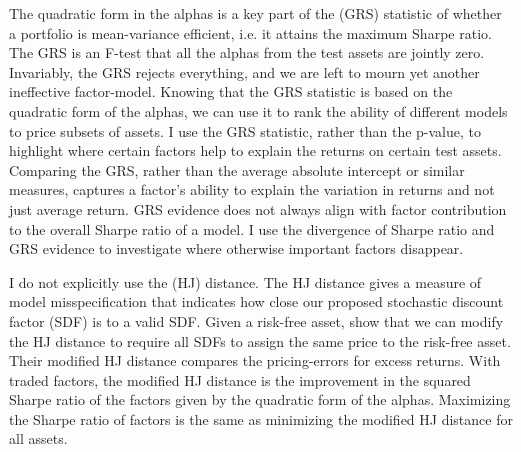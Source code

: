 The quadratic form in the alphas is a key part of the \textcite{gibbons1989test} (GRS)
statistic of whether a portfolio is mean-variance efficient, i.e. it attains the maximum
Sharpe ratio. The GRS is an F-test that all the alphas from the test assets are jointly
zero. Invariably, the GRS rejects everything, and we are left to mourn yet another
ineffective factor-model. Knowing that the GRS statistic is based on the quadratic form of
the alphas, we can use it to rank the ability of different models to price subsets of
assets. I use the GRS statistic, rather than the p-value, to highlight where certain
factors help to explain the returns on certain test assets. Comparing the GRS, rather than
the average absolute intercept or similar measures, captures a factor’s ability to explain
the variation in returns and not just average return. GRS evidence does not always align
with factor contribution to the overall Sharpe ratio of a model. I use the divergence of
Sharpe ratio and GRS evidence to investigate where otherwise important factors disappear.

I do not explicitly use the \textcite{hansen1997assessing} (HJ) distance. The HJ distance
gives a measure of model misspecification that indicates how close our proposed stochastic
discount factor (SDF) is to a valid SDF. Given a risk-free asset, \textcite{kan2008model}
show that we can modify the HJ distance to require all SDFs to assign the same price to
the risk-free asset. Their modified HJ distance compares the pricing-errors for excess
returns. With traded factors, the modified HJ distance is the improvement in the squared
Sharpe ratio of the factors given by the quadratic form of the alphas. Maximizing the
Sharpe ratio of factors is the same as minimizing the modified HJ distance for all assets.
